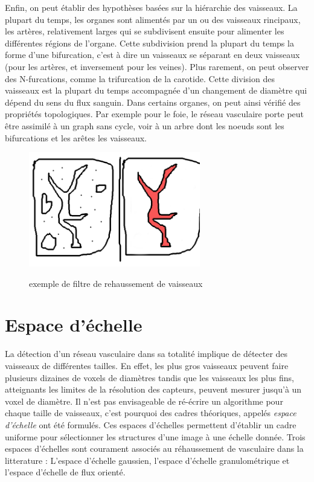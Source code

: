 Enfin, on peut établir des hypothèses basées sur la hiérarchie des vaisseaux. La plupart du temps, les organes sont alimentés par un ou des vaisseaux rincipaux, les artères, relativement larges qui se subdivisent ensuite pour alimenter les différentes régions de l'organe. Cette subdivision prend la plupart du temps la forme d'une bifurcation, c'est à dire un vaisseaux se séparant en deux vaisseaux (pour les artères, et inversement pour les veines). Plus rarement, on peut observer des N-furcations, comme la trifurcation de la carotide. Cette division des vaisseaux est la plupart du temps accompagnée d'un changement de diamètre qui dépend du sens du flux sanguin. Dans certains organes, on peut ainsi vérifié des propriétés topologiques. Par exemple pour le foie, le réseau vasculaire porte peut être assimilé à un graph sans cycle, voir à un arbre dont les noeuds sont les bifurcations et les arêtes les vaisseaux.

\begin{figure}
  \centering
  \includegraphics[height=5cm]{Images/example_enhancement.png}
  \label{fig:exemple_vesselness}
  \caption{exemple de filtre de rehaussement de vaisseaux}
\end{figure}

\section{Espace d'échelle}
\label{sec:EA:rehaussement:echelle}


La détection d'un réseau vasculaire dans sa totalité implique de détecter des vaisseaux de différentes tailles. En effet, les plus gros vaisseaux peuvent faire plusieurs dizaines de voxels de diamètres tandis que les vaisseaux les plus fins, atteignants les limites de la résolution des capteurs, peuvent  mesurer jusqu'à un voxel de diamètre. Il n'est pas envisageable de ré-écrire un algorithme pour chaque taille de vaisseaux, c'est pourquoi des cadres théoriques, appelés \emph{espace d'échelle} ont été formulés. Ces espaces d'échelles permettent d'établir un cadre uniforme pour sélectionner les structures d'une image à une échelle donnée. Trois espaces d'échelles sont courament associés au réhaussement de vasculaire dans la litterature : L'espace d'échelle gaussien, l'espace d'échelle granulométrique et l'espace d'échelle de flux orienté.

